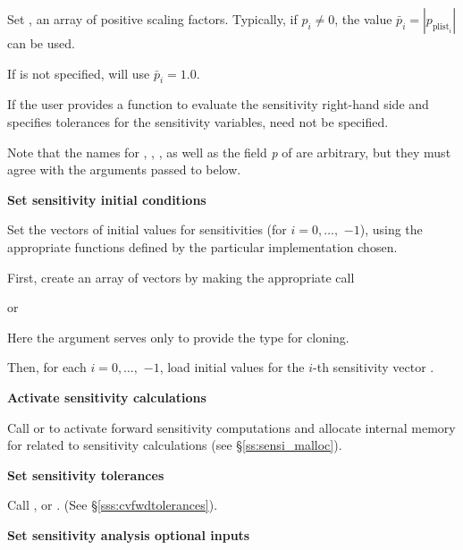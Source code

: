\begin{Steps}
\begin{itemize}
      Set , an array of  positive scaling factors. Typically,
      if $p_i \ne 0$, the value ${\bar p}_i = |p_{\text{plist}_i}|$ can be used.

      If  is not specified, {\cvodes} will use ${\bar p}_i = 1.0$.

      If the user provides a function to evaluate the sensitivity right-hand side and specifies
      tolerances for the sensitivity variables,  need not be specified.

    \end{itemize}

    Note that the names for , , , as well as the field
    {\em p} of  are arbitrary, but they must agree with the arguments
    passed to  below.

\item
  {\bf Set sensitivity initial conditions}

  Set the  vectors  of initial values
  for sensitivities (for $i=0,\ldots,$  $ - 1$), using the
  appropriate functions defined by the particular {\nvector} implementation chosen.

  First, create an array of  vectors by making the appropriate call


  or


  Here the argument  serves only to provide the 
  type for cloning.

  Then, for each $i = 0,\ldots, $ $ - 1$, load initial values
  for the $i$-th sensitivity vector .

\item
  {\bf Activate sensitivity calculations}

  Call  or  to activate forward 
  sensitivity computations and allocate internal memory for {\cvodes} related 
  to sensitivity calculations (see \S\ref{ss:sensi_malloc}).

\item
  {\bf Set sensitivity tolerances}

  Call ,  or
  . (See \S\ref{sss:cvfwdtolerances}).

\item
  {\bf Set sensitivity analysis optional inputs}


\end{Steps}
